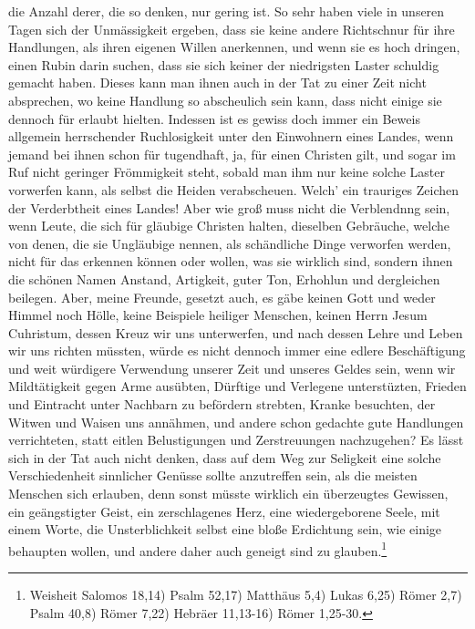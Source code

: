 die Anzahl derer, die so denken, nur gering ist. So sehr haben viele in unseren
Tagen sich der Unmässigkeit ergeben, dass sie keine andere Richtschnur für ihre
Handlungen, als ihren eigenen Willen anerkennen, und wenn sie es hoch dringen,
einen Rubin darin suchen, dass sie sich keiner der niedrigsten Laster schuldig
gemacht haben. Dieses kann man ihnen auch in der Tat zu einer Zeit nicht
absprechen, wo keine Handlung so abscheulich sein kann, dass nicht einige sie
dennoch für erlaubt hielten. Indessen ist es gewiss doch immer ein Beweis
allgemein herrschender Ruchlosigkeit unter den Einwohnern eines Landes, wenn
jemand bei ihnen schon für tugendhaft, ja, für einen Christen gilt, und sogar im
Ruf nicht geringer Frömmigkeit steht, sobald man ihm nur keine solche Laster
vorwerfen kann, als selbst die Heiden verabscheuen.
Welch' ein trauriges
Zeichen
der Verderbtheit eines Landes! Aber wie groß muss
nicht die Verblendnng sein,
wenn Leute, die sich für gläubige Christen halten, dieselben Gebräuche, welche
von denen, die sie Ungläubige nennen, als schändliche Dinge verworfen werden,
nicht für das erkennen können oder wollen, was sie wirklich sind, sondern ihnen
die schönen Namen Anstand, Artigkeit, guter Ton, Erhohlun und dergleichen
beilegen.
Aber, meine Freunde, gesetzt auch, es gäbe keinen Gott und weder Himmel noch
Hölle, keine Beispiele heiliger Menschen, keinen Herrn Jesum Cuhristum, dessen
Kreuz wir uns unterwerfen, und nach dessen Lehre und Leben
wir uns richten
müssten, würde es nicht dennoch immer eine edlere Beschäftigung und weit
würdigere Verwendung unserer Zeit und unseres Geldes sein, wenn wir
Mildtätigkeit gegen Arme ausübten, Dürftige und Verlegene
unterstüzten,
Frieden und Eintracht unter Nachbarn zu befördern strebten, Kranke besuchten,
der Witwen und Waisen uns annähmen, und andere schon gedachte gute Handlungen
verrichteten, statt eitlen Belustigungen und Zerstreuungen nachzugehen? Es lässt
sich in der Tat auch nicht denken, dass auf dem Weg zur Seligkeit eine solche
Verschiedenheit sinnlicher Genüsse sollte anzutreffen sein, als die meisten
Menschen sich erlauben, denn sonst müsste wirklich ein überzeugtes Gewissen, ein
geängstigter Geist, ein zerschlagenes Herz, eine wiedergeborene Seele, mit
einem Worte, die Unsterblichkeit selbst eine bloße Erdichtung sein, wie einige
behaupten wollen, und andere daher auch geneigt sind zu
glauben.\footnote{Weisheit Salomos 18,14)
Psalm 52,17)
Matthäus 5,4)
Lukas 6,25)
Römer 2,7)
Psalm 40,8)
Römer 7,22)
Hebräer 11,13-16)
Römer 1,25-30.}
